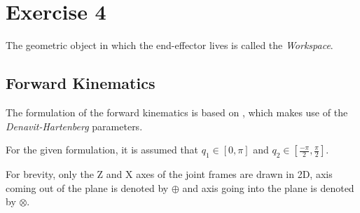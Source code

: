 \section{Exercise 4}
The geometric object in which the end-effector lives is called the \emph{Workspace}.
\subsection{Forward Kinematics}
The formulation of the forward kinematics is based on \cite{Craig}, which makes use of the \emph{Denavit-Hartenberg} parameters.

For the given formulation, it is assumed that $q_1 \in \left[0,\pi\right]$ and $q_2 \in \left[\frac{-\pi}{2},\frac{\pi}{2}\right]$.

For brevity, only the Z and X axes of the joint frames are drawn in 2D, axis coming out of the plane is denoted by $\oplus$ and axis going into the plane is denoted by $\otimes$.

\begin{figure}[h!]
	
\end{figure}
